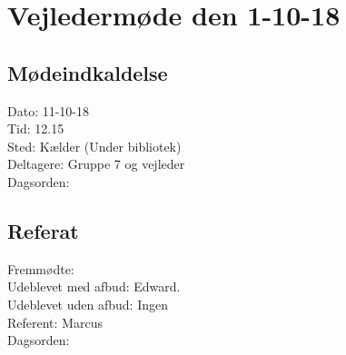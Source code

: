 \section{Vejledermøde den 1-10-18}
\subsection{Mødeindkaldelse}
Dato: 11-10-18
\\Tid: 12.15
\\Sted: Kælder (Under bibliotek)
\\Deltagere: Gruppe 7 og vejleder
\\Dagsorden:
 
 \subsection{Referat}
 Fremmødte: 
 \\Udeblevet med afbud: Edward.
 \\Udeblevet uden afbud: Ingen
 \\Referent: Marcus
 \\Dagsorden:
 
